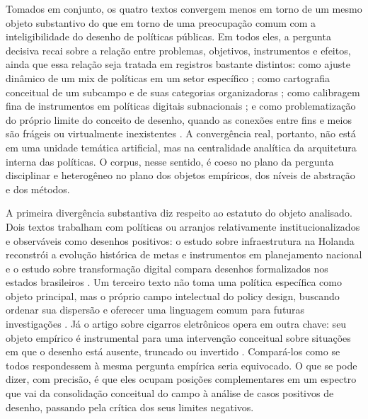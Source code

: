 \documentclass[12pt,a4paper]{article}
\begin{document}
Tomados em conjunto, os quatro textos convergem menos em torno de um mesmo objeto substantivo do que em torno de uma preocupação comum com a inteligibilidade do desenho de políticas públicas. Em todos eles, a pergunta decisiva recai sobre a relação entre problemas, objetivos, instrumentos e efeitos, ainda que essa relação seja tratada em registros bastante distintos: como ajuste dinâmico de um mix de políticas em um setor específico \parencite{geet2019_policy_design}; como cartografia conceitual de um subcampo e de suas categorias organizadoras \parencite{lima2021_conectando_problemas}; como calibragem fina de instrumentos em políticas digitais subnacionais \parencite{lui2026_micro_dimensions}; e como problematização do próprio limite do conceito de desenho, quando as conexões entre fins e meios são frágeis ou virtualmente inexistentes \parencite{newman2020_policy_design}. A convergência real, portanto, não está em uma unidade temática artificial, mas na centralidade analítica da arquitetura interna das políticas. O corpus, nesse sentido, é coeso no plano da pergunta disciplinar e heterogêneo no plano dos objetos empíricos, dos níveis de abstração e dos métodos.

A primeira divergência substantiva diz respeito ao estatuto do objeto analisado. Dois textos trabalham com políticas ou arranjos relativamente institucionalizados e observáveis como desenhos positivos: o estudo sobre infraestrutura na Holanda reconstrói a evolução histórica de metas e instrumentos em planejamento nacional \parencite{geet2019_policy_design} e o estudo sobre transformação digital compara desenhos formalizados nos estados brasileiros \parencite{lui2026_micro_dimensions}. Um terceiro texto não toma uma política específica como objeto principal, mas o próprio campo intelectual do policy design, buscando ordenar sua dispersão e oferecer uma linguagem comum para futuras investigações \parencite{lima2021_conectando_problemas}. Já o artigo sobre cigarros eletrônicos opera em outra chave: seu objeto empírico é instrumental para uma intervenção conceitual sobre situações em que o desenho está ausente, truncado ou invertido \parencite{newman2020_policy_design}. Compará-los como se todos respondessem à mesma pergunta empírica seria equivocado. O que se pode dizer, com precisão, é que eles ocupam posições complementares em um espectro que vai da consolidação conceitual do campo à análise de casos positivos de desenho, passando pela crítica dos seus limites negativos.
\end{document}
